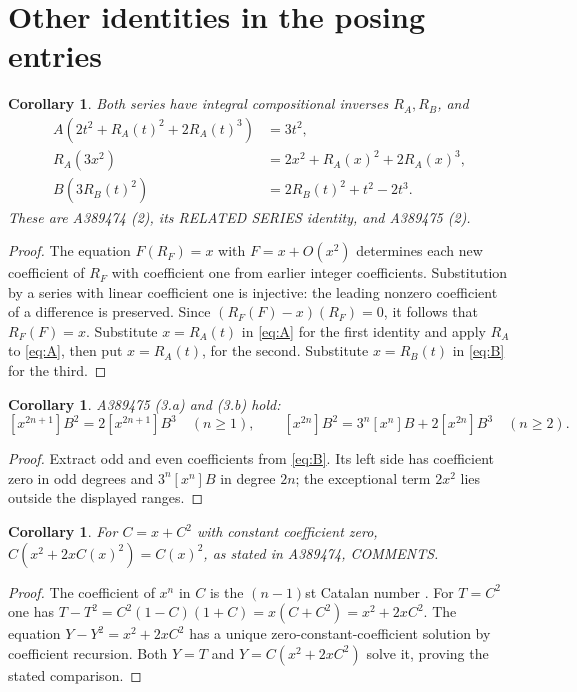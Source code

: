 \documentclass[11pt]{article}
\newtheorem{corollary}[theorem]{Corollary}
\newcommand{\coef}[1]{[x^{#1}]}
\begin{document}
\section{Other identities in the posing entries}
\begin{corollary}\label{cor:inverses}
Both series have integral compositional inverses $R_A,R_B$, and
\begin{align*}
 A(2t^2+R_A(t)^2+2R_A(t)^3)&=3t^2,\\
 R_A(3x^2)&=2x^2+R_A(x)^2+2R_A(x)^3,\\
 B(3R_B(t)^2)&=2R_B(t)^2+t^2-2t^3.
\end{align*}
These are A389474 (2), its RELATED SERIES identity, and A389475 (2).
\end{corollary}
\begin{proof}
The equation $F(R_F)=x$ with $F=x+O(x^2)$ determines each new
coefficient of $R_F$ with coefficient one from earlier integer
coefficients. Substitution by a series with linear coefficient one is
injective: the leading nonzero coefficient of a difference is preserved.
Since $(R_F(F)-x)(R_F)=0$, it follows that $R_F(F)=x$.
Substitute $x=R_A(t)$ in \eqref{eq:A} for the first identity and
apply $R_A$ to \eqref{eq:A}, then put $x=R_A(t)$, for the second.
Substitute $x=R_B(t)$ in \eqref{eq:B} for the third.
\end{proof}

\begin{corollary}\label{cor:coefficients}
A389475 (3.a) and (3.b) hold:
\[
 \coef{2n+1}B^2=2\coef{2n+1}B^3\quad(n\geq1),\qquad
 \coef{2n}B^2=3^n\coef n B+2\coef{2n}B^3\quad(n\geq2).
\]
\end{corollary}
\begin{proof}
Extract odd and even coefficients from \eqref{eq:B}. Its left side has
coefficient zero in odd degrees and $3^n\coef n B$ in degree $2n$;
the exceptional term $2x^2$ lies outside the displayed ranges.
\end{proof}

\begin{corollary}\label{cor:catalan}
For $C=x+C^2$ with constant coefficient zero,
$C(x^2+2xC(x)^2)=C(x)^2$, as stated in A389474, COMMENTS.
\end{corollary}
\begin{proof}
The coefficient of $x^n$ in $C$ is the $(n-1)$st Catalan number \cite{catalan}.
For $T=C^2$ one has
$T-T^2=C^2(1-C)(1+C)=x(C+C^2)=x^2+2xC^2$.
The equation $Y-Y^2=x^2+2xC^2$ has a unique zero-constant-coefficient
solution by coefficient recursion. Both $Y=T$ and
$Y=C(x^2+2xC^2)$ solve it, proving the stated comparison.
\end{proof}
\end{document}

